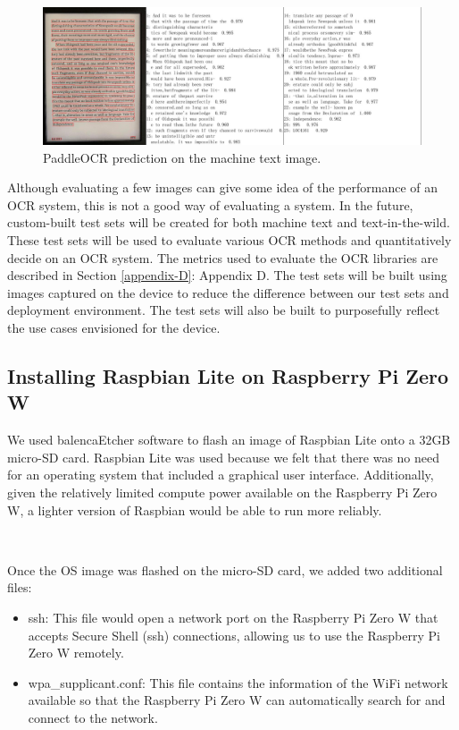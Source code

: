 \documentclass[a4paper,11pt]{article}
\begin{document}
\begin{figure}[H]
\centering
\includegraphics[scale=0.3]{img/ocr_testing/kindle_paddleocr.jpg}
\caption{PaddleOCR prediction on the machine text image.}
\label{fig:kindle_paddleocr}
\end{figure}

\noindent
Although evaluating a few images can give some idea of the performance of an OCR system, this is not a good way of evaluating a system. In the future, custom-built test sets will be created for both machine text and text-in-the-wild. These test sets will be used to evaluate various OCR methods and quantitatively decide on an OCR system. The metrics used to evaluate the OCR libraries are described in Section \ref{appendix-D}: Appendix D. The test sets will be built using images captured on the device to reduce the difference between our test sets and deployment environment. The test sets will also be built to purposefully reflect the use cases envisioned for the device.

\subsection{Installing Raspbian Lite on Raspberry Pi Zero W}
We used balencaEtcher software to flash an image of Raspbian Lite onto a 32GB micro-SD card. Raspbian Lite was used because we felt that there was no need for an operating system that included a graphical user interface. Additionally, given the relatively limited compute power available on the Raspberry Pi Zero W, a lighter version of Raspbian would be able to run more reliably.

\

\noindent
Once the OS image was flashed on the micro-SD card, we added two additional files:

\begin{itemize}
    \item ssh: This file would open a network port on the Raspberry Pi Zero W that accepts Secure Shell (ssh) connections, allowing us to use the Raspberry Pi Zero W remotely.
    \item wpa\_supplicant.conf: This file contains the information of the WiFi network available so that the Raspberry Pi Zero W can automatically search for and connect to the network.
\end{itemize}
\end{document}
